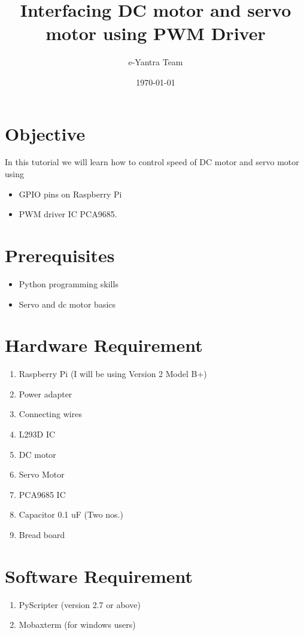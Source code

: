 \documentclass[11pt,a4paper]{article}
\title{Interfacing DC motor and servo motor using PWM Driver}
\author{e-Yantra Team}
\date{\today}
\begin{document}
	\maketitle
	\newpage
	\tableofcontents
	\newpage
	\section{Objective}
	In this tutorial we will learn how to control speed of DC motor and servo motor using
	 \begin{itemize}
	 	 \item GPIO pins on Raspberry Pi
	 	 \item PWM driver IC PCA9685.
	 \end{itemize}
	\section{Prerequisites}
	\begin{itemize}
		\item Python programming skills
		\item Servo and dc motor basics
	\end{itemize}
	\section{Hardware Requirement}
		\begin{enumerate}
			\item Raspberry Pi (I will be using Version 2 Model B+)
			\item Power adapter
			\item Connecting wires
			\item L293D IC
			\item DC motor
			\item Servo Motor
			\item PCA9685 IC
			\item Capacitor 0.1 uF (Two nos.)
			\item Bread board
		\end{enumerate}
	\section{Software Requirement}
	\begin{enumerate}
		\item PyScripter (version 2.7 or above)
		\item Mobaxterm (for windows users)
	\end{enumerate}
	\newpage
\end{document}
